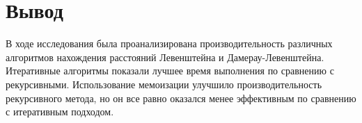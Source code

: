 \section*{Вывод}

В ходе исследования была проанализирована производительность различных алгоритмов нахождения расстояний Левенштейна и Дамерау-Левенштейна. Итеративные алгоритмы показали лучшее время выполнения по сравнению с рекурсивными. Использование мемоизации улучшило производительность рекурсивного метода, но он все равно оказался менее эффективным по сравнению с итеративным подходом.
